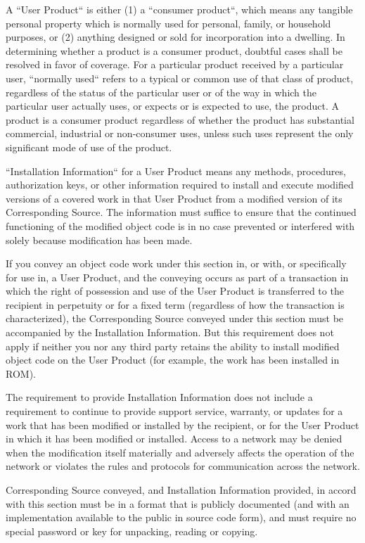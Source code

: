 \documentclass[a4paper, 11pt, twoside]{article}
\begin{document}
A “User Product“ is either (1) a “consumer product“, which means any tangible personal property which is normally used for personal, family, or household purposes, or (2) anything designed or sold for incorporation into a dwelling. In determining whether a product is a consumer product, doubtful cases shall be resolved in favor of coverage. For a particular product received by a particular user, “normally used“ refers to a typical or common use of that class of product, regardless of the status of the particular user or of the way in which the particular user actually uses, or expects or is expected to use, the product. A product is a consumer product regardless of whether the product has substantial commercial, industrial or non-consumer uses, unless such uses represent the only significant mode of use of the product.

“Installation Information“ for a User Product means any methods, procedures, authorization keys, or other information required to install and execute modified versions of a covered work in that User Product from a modified version of its Corresponding Source. The information must suffice to ensure that the continued functioning of the modified object code is in no case prevented or interfered with solely because modification has been made.

If you convey an object code work under this section in, or with, or specifically for use in, a User Product, and the conveying occurs as part of a transaction in which the right of possession and use of the User Product is transferred to the recipient in perpetuity or for a fixed term (regardless of how the transaction is characterized), the Corresponding Source conveyed under this section must be accompanied by the Installation Information. But this requirement does not apply if neither you nor any third party retains the ability to install modified object code on the User Product (for example, the work has been installed in ROM).

The requirement to provide Installation Information does not include a requirement to continue to provide support service, warranty, or updates for a work that has been modified or installed by the recipient, or for the User Product in which it has been modified or installed. Access to a network may be denied when the modification itself materially and adversely affects the operation of the network or violates the rules and protocols for communication across the network.

Corresponding Source conveyed, and Installation Information provided, in accord with this section must be in a format that is publicly documented (and with an implementation available to the public in source code form), and must require no special password or key for unpacking, reading or copying.
\end{document}
